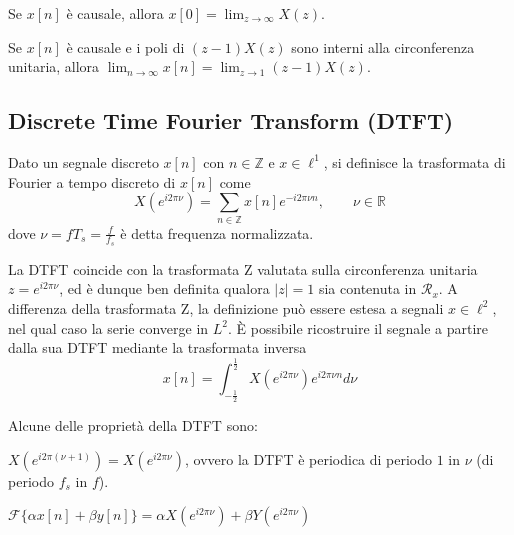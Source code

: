         \begin{property}
            Se $x[n]$ è causale, allora $x[0] = \lim_{z \to \infty} X(z)$.
        \end{property}

        \begin{property}
            Se $x[n]$ è causale e i poli di $(z - 1) X(z)$ sono interni alla circonferenza unitaria, allora $\lim_{n \to \infty} x[n] = \lim_{z \to 1} (z - 1) X(z)$.
        \end{property}

    \subsection{Discrete Time Fourier Transform (DTFT)}
        \begin{definition}
            Dato un segnale discreto $x[n]$ con $n \in \mathbb{Z}$ e $x \in \ell^1$, si definisce la trasformata di Fourier a tempo discreto di $x[n]$ come
            \[
                X(e^{i 2 \pi \nu}) = \sum_{n \in \mathbb{Z}} x[n] e^{-i 2 \pi \nu n}, \qquad \nu \in \mathbb{R}
            \]
            dove $\nu = f T_s = \frac{f}{f_s}$ è detta frequenza normalizzata.
        \end{definition}

        La DTFT coincide con la trasformata Z valutata sulla circonferenza unitaria $z = e^{i 2 \pi \nu}$, ed è dunque ben definita qualora $|z| = 1$ sia contenuta in $\mathcal{R}_{x}$.
        A differenza della trasformata Z, la definizione può essere estesa a segnali $x \in \ell^2$, nel qual caso la serie converge in $L^2$.
        È possibile ricostruire il segnale a partire dalla sua DTFT mediante la trasformata inversa
        \[
            x[n] = \int_{-\frac{1}{2}}^{\frac{1}{2}} X(e^{i 2 \pi \nu}) e^{i 2 \pi \nu n} d\nu
        \]

        Alcune delle proprietà della DTFT sono:

        \begin{property}[Periodicità]
            $X(e^{i 2 \pi (\nu + 1)}) = X(e^{i 2 \pi \nu})$, ovvero la DTFT è periodica di periodo $1$ in $\nu$ (di periodo $f_s$ in $f$).
        \end{property}

        \begin{property}[Linearità]
            $\mathcal{F}\{\alpha x[n] + \beta y[n]\} = \alpha X(e^{i 2 \pi \nu}) + \beta Y(e^{i 2 \pi \nu})$
        \end{property}


